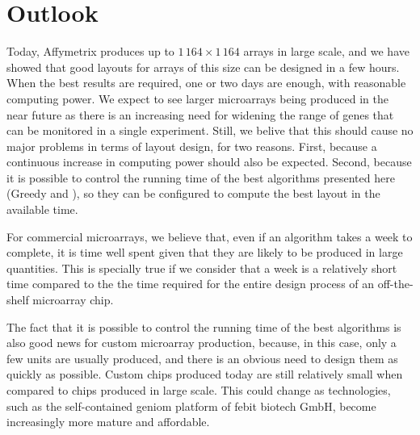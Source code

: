 \section{Outlook}
\label{sec:discuss_outlook}

Today, Affymetrix produces up to $1\,164\times 1\,164$ arrays in large scale,
and we have showed that good layouts for arrays of this size can be designed in
a few hours. When the best results are required, one or two days are enough,
with reasonable computing power. We expect to see larger microarrays being
produced in the near future as there is an increasing need for widening the
range of genes that can be monitored in a single experiment. Still, we belive
that this should cause no major problems in terms of layout design, for two
reasons. First, because a continuous increase in computing power should also be
expected. Second, because it is possible to control the running time of the best
algorithms presented here (Greedy and \Greedyplus), so they can be configured to
compute the best layout in the available time. 

For commercial microarrays, we believe that, even if an algorithm takes a week
to complete, it is time well spent given that they are likely to be produced in
large quantities. This is specially true if we consider that a week is a
relatively short time compared to the the time required for the entire design
process of an off-the-shelf microarray chip.

The fact that it is possible to control the running time of the best algorithms
is also good news for custom microarray production, because, in this case, only
a few units are usually produced, and there is an obvious need to design them as
quickly as possible. Custom chips produced today are still relatively small when
compared to chips produced in large scale. This could change as
technologies, such as the self-contained {\sffamily geniom} platform of febit
biotech GmbH, become increasingly more mature and affordable.
